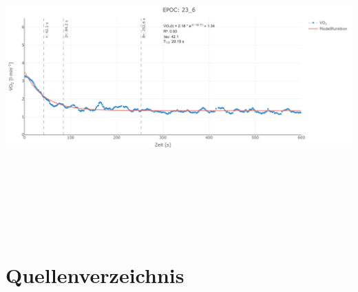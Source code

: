 \documentclass[
  letterpaper,
  DIV=11]{scrartcl}
\begin{document}
\includegraphics[width=11.45833in,height=4.6875in]{images/23_6.png}

\section{Quellenverzeichnis}\label{quellenverzeichnis}
\end{document}
